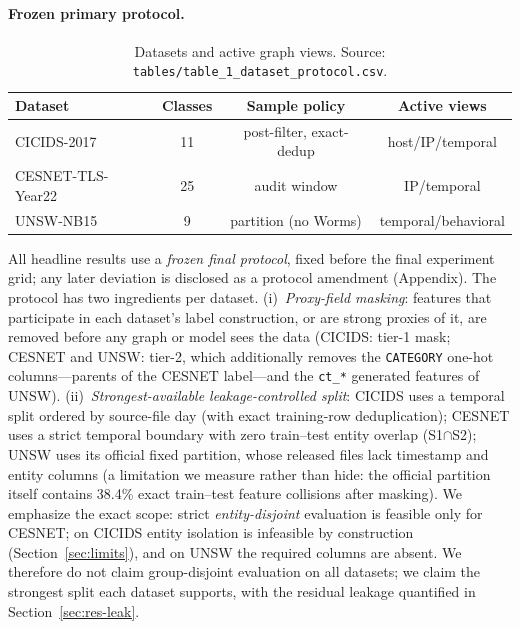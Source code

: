 \documentclass[pdflatex,referee,lineno,sn-basic,Numbered]{sn-jnl}
\begin{document}
\paragraph{Frozen primary protocol.}

\begin{table}[t]
\centering
\caption{Datasets and active graph views. Source: \texttt{tables/table\_1\_dataset\_protocol.csv}.}
\label{tab:data}
\small
\begin{tabular}{lccc}
\toprule
Dataset & Classes & Sample policy & Active views \\
\midrule
CICIDS-2017 & 11 & post-filter, exact-dedup & host/IP/temporal \\
CESNET-TLS-Year22 & 25 & audit window & IP/temporal \\
UNSW-NB15 & 9 & partition (no Worms) & temporal/behavioral \\
\bottomrule
\end{tabular}
\end{table}

All headline results use a \emph{frozen final protocol}, fixed before the final
experiment grid; any later deviation is disclosed as a protocol amendment
(Appendix). The protocol has two ingredients per dataset. (i)~\emph{Proxy-field
masking}: features that participate in each dataset's label construction, or are
strong proxies of it, are removed before any graph or model sees the data
(CICIDS: tier-1 mask; CESNET and UNSW: tier-2, which additionally removes the
\texttt{CATEGORY} one-hot columns---parents of the CESNET label---and the
\texttt{ct\_*} generated features of UNSW). (ii)~\emph{Strongest-available
leakage-controlled split}: CICIDS uses a temporal split ordered by source-file day
(with exact training-row deduplication); CESNET uses a strict temporal boundary
with zero train--test entity overlap (S1$\cap$S2); UNSW uses its official fixed
partition, whose released files lack timestamp and entity columns (a limitation
we measure rather than hide: the official partition itself contains 38.4\%
exact train--test feature collisions after masking). We emphasize the exact
scope: strict \emph{entity-disjoint} evaluation is feasible only for CESNET;
on CICIDS entity isolation is infeasible by construction
(Section~\ref{sec:limits}), and on UNSW the required columns are absent. We
therefore do not claim group-disjoint evaluation on all datasets; we claim the
strongest split each dataset supports, with the residual leakage quantified in
Section~\ref{sec:res-leak}.
\end{document}
